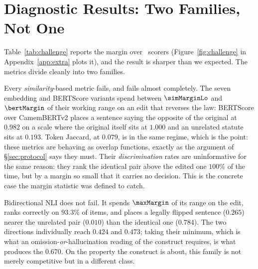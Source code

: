\documentclass[11pt]{article}
\begin{document}
\section{Diagnostic Results: Two Families, Not One}
\label{sec:results}

Table~\ref{tab:challenge} reports the margin over \nMetricsChallenged\ scorers
(Figure~\ref{fig:challenge} in Appendix~\ref{app:extra} plots it), and the result is sharper than we expected. The
metrics divide cleanly into two families.

Every \emph{similarity}-based metric fails, and fails almost completely. The
seven embedding and BERTScore variants spend between $\simMarginLo$ and
$\bertMargin$ of their working range on an edit that reverses the law: BERTScore
over CamemBERTv2 places a sentence saying the opposite of the original at
$0.982$ on a scale where the original itself sits at $1.000$ and an unrelated
statute sits at $0.193$. Token Jaccard, at $0.079$, is in the same regime, which
is the point: these metrics are behaving as overlap functions, exactly as the
argument of \S\ref{sec:protocol} says they must. Their \emph{discrimination}
rates are uninformative for the same reason: they rank the identical pair above
the edited one $100\%$ of the time, but by a margin so small that it carries no
decision. This is the concrete case the margin statistic was defined to catch.

Bidirectional NLI does not fail. It spends $\maxMargin$ of its range on the
edit, ranks correctly on $93.3\%$ of items, and places a legally flipped
sentence ($0.265$) nearer the unrelated pair ($0.010$) than the identical one
($0.784$). The two directions individually reach $0.424$ and $0.473$; taking
their minimum, which is what an omission-\emph{or}-hallucination reading of the
construct requires, is what produces the $0.670$. On the property the construct
is about, this family is not merely competitive but in a different class.

\begin{table}[t]\centering\small

\caption{\textsc{LegalEdit}. Scores min--max normalised per metric.
\emph{discrim.} is the share of items ranked correctly (identical $>$ edited);
\emph{margin} is the fraction of the identical-to-unrelated range spent on the
legal edit. Correct ranking is necessary but far from sufficient: the
similarity metrics rank $100\%$ of items correctly while moving almost nothing,
which is why the margin, not the rate, is the quantity to read.}
\label{tab:challenge}
\end{table}
\end{document}
